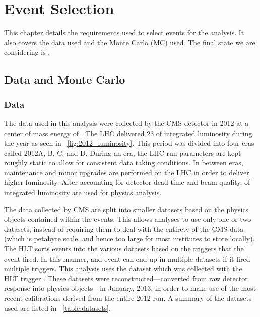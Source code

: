 \chapter{Event Selection}
\label{event_selection_chapter}

This chapter details the requirements used to select events for the analysis.
It also covers the data used and the Monte Carlo (MC) used. The final state we
are considering is \Ztoee.

\section{Data and Monte Carlo}

\subsection{Data}


The data used in this analysis were collected by the CMS detector in 2012 at a
center of mass energy of \rootseight. The LHC delivered 23 \fbinv of integrated
luminosity during the year as seen in \FIG~\ref{fig:2012_luminosity}. This
period was divided into four eras called 2012A, B, C, and D. During an era, the
LHC run parameters are kept roughly static to allow for consistent data taking
conditions. In between eras, maintenance and minor upgrades are performed on
the LHC in order to deliver higher luminosity. After accounting for detector
dead time and beam quality, \GoodLumiNumber of integrated luminosity are used
for physics analysis.

The data collected by CMS are split into smaller datasets based on the physics
objects contained within the events. This allows analyses to use only one or
two datasets, instead of requiring them to deal with the entirety of the CMS
data (which is petabyte scale, and hence too large for most institutes to store
locally). The HLT sorts events into the various datasets based on the triggers
that the event fired. In this manner, and event can end up in multiple datasets
if it fired multiple triggers. This analysis uses the \SingleElectron dataset
which was collected with the HLT trigger \SingleElectronTrigger. These datasets
were reconstructed---converted from raw detector response into physics
objects---in January, 2013, in order to make use of the most recent
calibrations derived from the entire 2012 run. A summary of the datasets used
are listed in \TAB~\ref{table:datasets}.

